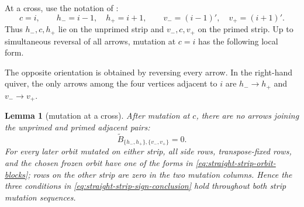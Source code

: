 \documentclass[11pt]{amsart}
\newtheorem{lemma}[theorem]{Lemma}
\theoremstyle{definition}
\theoremstyle{remark}
\begin{document}
At a cross, use the notation of
\cite[Lemma~6.16]{FeiKroneckerII}:
\[ c=i,\qquad h_-=i-1,\quad h_+=i+1,\qquad v_-=(i-1)',\quad v_+=(i+1)'. \]
Thus $h_-,c,h_+$ lie on the unprimed strip and $v_-,c,v_+$ on the primed
strip.  Up to simultaneous reversal of all arrows, mutation at $c=i$ has
the following local form.
\begin{center}
\end{center}
The opposite orientation is obtained by reversing every arrow.  In the
right-hand quiver, the only arrows among the four vertices adjacent to $i$
are $h_-\to h_+$ and $v_-\to v_+$.

\begin{lemma}[mutation at a cross]
\label{lem:cross-local-matrix}
After mutation at $c$, there are no arrows joining the unprimed and primed
adjacent pairs:
\begin{equation}
 \widetilde B_{\{h_-,h_+\},\{v_-,v_+\}}=0.
 \label{eq:cross-zero-block}
\end{equation}
For every later orbit mutated on either strip, all side rows,
transpose-fixed rows, and the chosen frozen orbit have one of the forms in
\eqref{eq:straight-strip-orbit-blocks}; rows on the other strip are zero in
the two mutation columns.  Hence the three conditions in
\eqref{eq:straight-strip-sign-conclusion} hold throughout both strip
mutation sequences.
\end{lemma}
\end{document}
